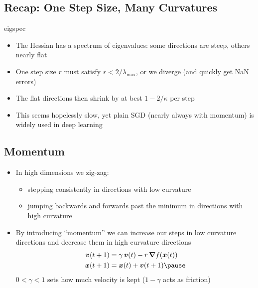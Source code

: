 \Outline %

\begin{slide}
\section[-2]{Recap: One Step Size, Many Curvatures}
\begin{rightImage}{eigspec}
\begin{PauseHighLight}
  \begin{itemize}
  \item The Hessian has a spectrum of eigenvalues: some directions are
    steep, others nearly flat\pause
  \item One step size $r$ must satisfy $r<2/\lambda_{\max}$, or we
    diverge (and quickly get NaN errors)\pause
  \item The flat directions then shrink by at best $1-2/\kappa$ per
    step\pause
  \item This seems hopelessly slow\pauseb, yet plain SGD (nearly always
    with momentum) is widely used in deep learning\pauseb
  \end{itemize}
\end{PauseHighLight}
\end{rightImage}
\end{slide}


\begin{slide}
  \section{Momentum}

  \begin{PauseHighLight}
    \begin{itemize}
    \item In high dimensions we zig-zag:
      \begin{itemize}
      \item stepping consistently in directions with low curvature
      \item jumping backwards and forwards past the minimum in
        directions with high curvature\pause
      \end{itemize}
    \item By introducing ``momentum'' we can increase our steps in
      low curvature directions and decrease them in high curvature directions
      \begin{align*}
        \bm{v}(t+1) &= \gamma \, \bm{v}(t) -  r\, \grad f(\bm{x}(t))\\
        \bm{x}(t+1) &= \bm{x}(t) + \bm{v}(t+1)\pause
      \end{align*}
      $0<\gamma<1$ sets how much velocity is kept ($1-\gamma$ acts as friction)\pauseb 
    \end{itemize}
  \end{PauseHighLight}


\end{slide}


